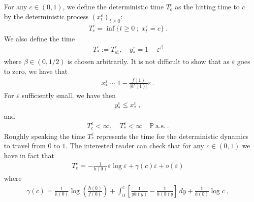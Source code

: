 \documentclass[reqno, 12pt, a4paper]{amsart}
\theoremstyle{plain}
\theoremstyle{definition}
\begin{document}
For any $c\in (0,1)$, we define the deterministic time $T^\varepsilon_c$ as the hitting time to $c$ by the deterministic process $(x^\varepsilon_t)_{t \ge 0}$: 
\begin{equation}
\begin{split}
T^\varepsilon_c = \inf \{ t \ge 0 \; ; \; x^\varepsilon_t =c\} \ .
\end{split}
\end{equation}
We also define the time
\begin{equation}
\begin{split}
T_*^\varepsilon:= T^\varepsilon_{y^\varepsilon_*}, \quad y_*^\varepsilon = 1- \varepsilon^{\beta}
\end{split}
\end{equation}
where $\beta \in (0,1/2)$ is chosen arbitrarily. It is not difficult to show that as $\varepsilon$ goes to zero, we have that 
\begin{equation}
\label{eq:xstarepsilon}
\begin{split}
x^\varepsilon_*  \sim 1 -  \frac{f(1)}{\vert h'(1) \vert } \varepsilon \ .
\end{split}
\end{equation}
For $\varepsilon$ sufficiently small, we have then
\begin{equation}
\begin{split}
y^\varepsilon_* \le x^\varepsilon_* \ ,
\end{split}
\end{equation}
and \begin{equation}
\begin{split}
T_c^\varepsilon < \infty, \quad T^\varepsilon_{*} < \infty \quad \mathbb P \ \text{a.s.} \ .
\end{split}
\end{equation}
Roughly speaking the time $T_*^\varepsilon$ represents the time for the deterministic dynamics to travel from $0$ to $1$. The interested reader can check that for any $c \in (0,1)$ we have in fact that 
\begin{equation}
\begin{split}
T^\varepsilon_c= -\frac{1}{h(0)} \varepsilon  \log \varepsilon  + \gamma (c) \varepsilon + o (\varepsilon) 
\end{split}
\end{equation}
where 
\begin{equation}
\begin{split}
\gamma (c) = \frac{1}{h(0)}  \log \left(\frac{h(0)}{f(0)} \right) +  \int_{0}^c \left[ \frac{1}{y h(y)} -\frac{1}{h(0)y} \right] \, dy  +  \frac{1}{h(0)} \log c \ ,
\end{split}
\end{equation}
\end{document}
